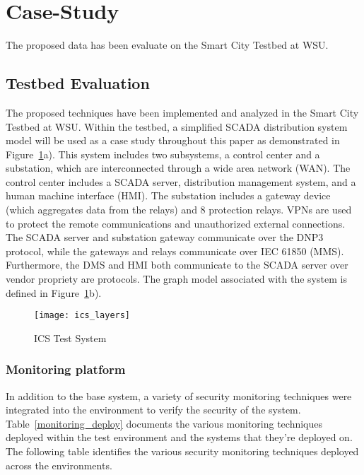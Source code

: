 \documentclass[journal]{IEEEtran}
\begin{document}
\section{Case-Study}
The proposed data has been evaluate on the Smart City Testbed at WSU. 

\subsection{Testbed Evaluation}
The proposed techniques have been implemented and analyzed in the Smart City Testbed at WSU. Within the testbed, a simplified SCADA distribution system model will be used as a case study throughout this paper as demonstrated in Figure~\ref{testbed}a). This system includes two subsystems, a control center and a substation, which are interconnected through a wide area network (WAN). The control center includes a SCADA server, distribution management system, and a human machine interface (HMI). The substation includes a gateway device (which aggregates data from the relays) and 8 protection relays.  VPNs are used to protect the remote communications and unauthorized external connections. The SCADA server and substation gateway communicate over the DNP3 protocol, while the gateways and relays communicate over IEC 61850 (MMS). Furthermore, the DMS and HMI both communicate to the SCADA server over vendor propriety are protocols. The graph model associated with the system is defined in Figure~\ref{testbed}b).

\begin{figure}
    \centering
    \texttt{[image: ics\_layers]}
    \label{testbed}
    \caption{ICS Test System}
\end{figure}

\subsubsection{Monitoring platform}
In addition to the base system, a variety of security monitoring techniques were integrated into the environment to verify the security of the system. Table~\ref{monitoring_deploy} documents the various monitoring techniques deployed within the test environment and the systems that they're deployed on.
The following table identifies the various security monitoring techniques deployed across the environments.
\end{document}

